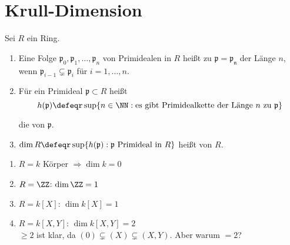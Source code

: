 \section{Krull-Dimension}

\begin{Def}
\label{2.24}
Sei $R$ ein Ring. 
\begin{enumerate}

\item Eine Folge $\mathfrak{p}_0, \mathfrak{p}_1, \dots ,\mathfrak{p}_n$
von Primidealen in $R$ hei\ss t  zu $\mathfrak{p}=\mathfrak{p_n}$
der L\"ange $n$, wenn $\mathfrak{p}_{i-1}\subsetneq \mathfrak{p}_i$ f\"ur $i=1,\ldots, n$.

\item F\"ur ein Primideal $\mathfrak{p}\subset R$ hei\ss t
$$ h(\mathfrak{p})\defeqr\sup\{n\in\NN:
\text{es gibt Primidealkette der L\"ange}\ n\ \text{zu}\ \mathfrak{p}\} $$

die  von $\mathfrak{p}$.

\item $\dim{R} \defeqr\sup\{h(\mathfrak{p}):\mathfrak{p}
\text{ Primideal in }R\}$
hei\ss t  von $R$.

\end{enumerate}
\end{Def}


\begin{nnBsp}
\begin{enumerate}
\item $R=k$ K\"orper $\Rightarrow \dim{k}=0$
\item $R=\ZZ$: $\dim{\ZZ}=1$
\item $R=k[X]$: $\dim{k[X]} =1$
\item $R=k[X,Y]$: $\dim{k[X,Y]} =2$\\
$\geq 2$ ist klar, da $(0)\subsetneq(X)\subsetneq(X,Y)$. Aber warum $=2$?
\end{enumerate}
\end{nnBsp}

